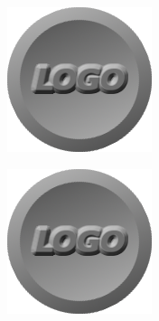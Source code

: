 \documentclass[a4paper,11pt]{article}
\begin{document}
\begin{figure}
\centering
\begin{minipage}{.5\textwidth}
  \centering
  \includegraphics[width=.4\linewidth]{images/logo.png}
  \label{fig:test1}
\end{minipage}%
\begin{minipage}{.5\textwidth}
  \centering
  \includegraphics[width=.4\linewidth]{images/logo.png}
  \label{fig:test2}
\end{minipage}
\end{figure}

\clearpage
\end{document}
